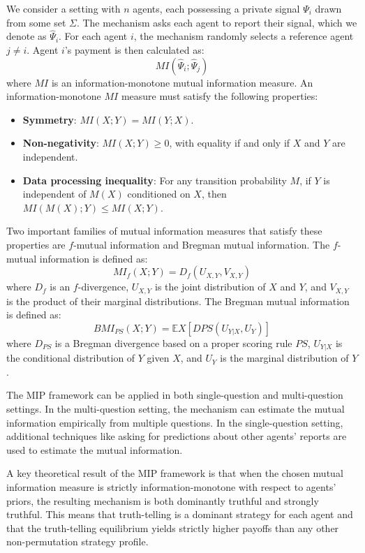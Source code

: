 \documentclass[
  letterpaper,
  DIV=11,
  numbers=noendperiod,
  oneside]{scrreprt}
\theoremstyle{remark}
\begin{document}
We consider a setting with \(n\) agents, each possessing a private
signal \(\Psi_i\) drawn from some set \(\Sigma\). The mechanism asks
each agent to report their signal, which we denote as \(\hat{\Psi}_i\).
For each agent \(i\), the mechanism randomly selects a reference agent
\(j \neq i\). Agent \(i\)'s payment is then calculated as:
\[MI(\hat{\Psi}_i; \hat{\Psi}_j)\] where \(MI\) is an
information-monotone mutual information measure. An information-monotone
\(MI\) measure must satisfy the following properties:

\begin{itemize}
\item
  \textbf{Symmetry}: \(MI(X; Y) = MI(Y; X)\).
\item
  \textbf{Non-negativity}: \(MI(X; Y) \geq 0\), with equality if and
  only if \(X\) and \(Y\) are independent.
\item
  \textbf{Data processing inequality}: For any transition probability
  \(M\), if \(Y\) is independent of \(M(X)\) conditioned on \(X\), then
  \(MI(M(X); Y) \leq MI(X; Y)\).
\end{itemize}

Two important families of mutual information measures that satisfy these
properties are \(f\)-mutual information and Bregman mutual information.
The \(f\)-mutual information is defined as:
\[MI_f(X; Y) = D_f(U_{X,Y}, V_{X,Y})\] where \(D_f\) is an
\(f\)-divergence, \(U_{X,Y}\) is the joint distribution of \(X\) and
\(Y\), and \(V_{X,Y}\) is the product of their marginal distributions.
The Bregman mutual information is defined as:
\[BMI_{PS}(X; Y) = \mathbb{E}X [D{PS}(U_{Y|X}, U_Y)]\] where \(D_{PS}\)
is a Bregman divergence based on a proper scoring rule \(PS\),
\(U_{Y|X}\) is the conditional distribution of \(Y\) given \(X\), and
\(U_Y\) is the marginal distribution of \(Y\).

The MIP framework can be applied in both single-question and
multi-question settings. In the multi-question setting, the mechanism
can estimate the mutual information empirically from multiple questions.
In the single-question setting, additional techniques like asking for
predictions about other agents' reports are used to estimate the mutual
information.

A key theoretical result of the MIP framework is that when the chosen
mutual information measure is strictly information-monotone with respect
to agents' priors, the resulting mechanism is both dominantly truthful
and strongly truthful. This means that truth-telling is a dominant
strategy for each agent and that the truth-telling equilibrium yields
strictly higher payoffs than any other non-permutation strategy profile.
\end{document}
